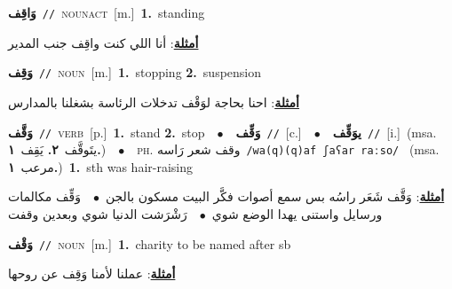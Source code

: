 \documentclass[10pt,a4paper,twoside]{article} %
\begin{document}
\begin{multicols}{2}
{\setlength\topsep{0pt}\textbf{\foreignlanguage{arabic}{وَاقِف}}\ {\color{gray}\texttt{//}\color{black}}\ \textsc{noun\textunderscore act}\ [m.]\ \textbf{1.}~standing\  \begin{flushright}\color{gray}\foreignlanguage{arabic}{\textbf{\underline{\foreignlanguage{arabic}{أمثلة}}}: أنا اللي كنت واقِف جنب المدير}\end{flushright}\color{black}} \vspace{2mm}

{\setlength\topsep{0pt}\textbf{\foreignlanguage{arabic}{وَقِف}}\ {\color{gray}\texttt{//}\color{black}}\ \textsc{noun}\ [m.]\ \textbf{1.}~stopping  \textbf{2.}~suspension\  \begin{flushright}\color{gray}\foreignlanguage{arabic}{\textbf{\underline{\foreignlanguage{arabic}{أمثلة}}}: احنا بحاجة لوَقْف تدخلات الرئاسة بشغلنا بالمدارس}\end{flushright}\color{black}} \vspace{2mm}

{\setlength\topsep{0pt}\textbf{\foreignlanguage{arabic}{وَقَّف}}\ {\color{gray}\texttt{//}\color{black}}\ \textsc{verb}\ [p.]\ \textbf{1.}~stand  \textbf{2.}~stop\ \ $\bullet$\ \ \setlength\topsep{0pt}\textbf{\foreignlanguage{arabic}{وَقِّف}}\ {\color{gray}\texttt{//}\color{black}}\ [c.]\ \ $\bullet$\ \ \setlength\topsep{0pt}\textbf{\foreignlanguage{arabic}{يوَقِّف}}\ {\color{gray}\texttt{//}\color{black}}\ [i.]\ \color{gray}(msa. \foreignlanguage{arabic}{يتَوقَّف}~\foreignlanguage{arabic}{\textbf{٢.}}  \foreignlanguage{arabic}{يَقِف}~\foreignlanguage{arabic}{\textbf{١.}})\color{black}\ \ $\bullet$\ \ \textsc{ph.} \color{gray} \foreignlanguage{arabic}{وقف شعر رَاسه}\color{black}\ {\color{gray}\texttt{/{\sffamily wa(q)(q)af ʃaʕar raːso}/}\color{black}}\ \color{gray} (msa. \foreignlanguage{arabic}{مرعب}~\foreignlanguage{arabic}{\textbf{١.}})\color{black}\ \textbf{1.}~sth was hair-raising\  \begin{flushright}\color{gray}\foreignlanguage{arabic}{\textbf{\underline{\foreignlanguage{arabic}{أمثلة}}}: وَقَّف شَعَر راسُه بس سمع أصوات فكَّر البيت مسكون بالجن\ $\bullet$\ \  وَقِّف مكالمات ورسايل واستنى يهدا الوضع شوي\ $\bullet$\ \  رَشْرَشت الدنيا شوي وبعدين وقفت}\end{flushright}\color{black}} \vspace{2mm}

{\setlength\topsep{0pt}\textbf{\foreignlanguage{arabic}{وَقْف}}\ {\color{gray}\texttt{//}\color{black}}\ \textsc{noun}\ [m.]\ \textbf{1.}~charity to be named after sb\  \begin{flushright}\color{gray}\foreignlanguage{arabic}{\textbf{\underline{\foreignlanguage{arabic}{أمثلة}}}: عملنا لأمنا وَقِف عن روحها}\end{flushright}\color{black}} \vspace{2mm}


\end{multicols}
\end{document}

